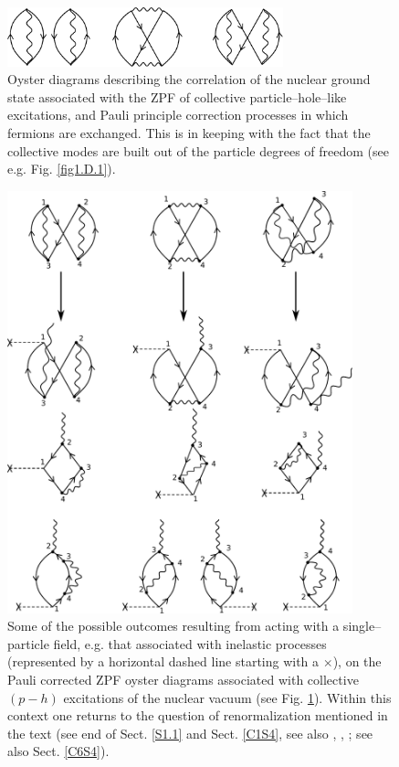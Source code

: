 \begin{figure}
\centerline {
\includegraphics*[width=8cm]{introduccion/figs/figintroA1}
}
\caption{Oyster diagrams describing the correlation of the nuclear ground state associated with the ZPF of  collective particle--hole--like excitations, and Pauli principle correction processes in which fermions are exchanged. This is in keeping with the fact that the collective modes are built out of the particle degrees of freedom (see e.g. Fig. \ref{fig1.D.1}).}
\label{figintroA1}
\end{figure}
\begin{figure}
\centerline {
\includegraphics*[width=10cm]{introduccion/figs/figintroA2}
}
\caption{Some of the possible outcomes resulting from acting with a single--particle field, e.g. that associated with inelastic processes (represented by a horizontal dashed line starting with a $\times$), on the Pauli corrected ZPF oyster diagrams associated with collective $(p-h)$ excitations of the nuclear vacuum (see Fig. \ref{figintroA1}). Within this context one returns to the question of  renormalization mentioned in the text (see end of Sect. \ref{S1.1} and Sect. \ref{C1S4}, see also \cite{Idini:15}, \cite{Broglia:16}, \cite{Barranco:17}; see also Sect. \ref{C6S4}).}
\label{figintroA2}
\end{figure}
